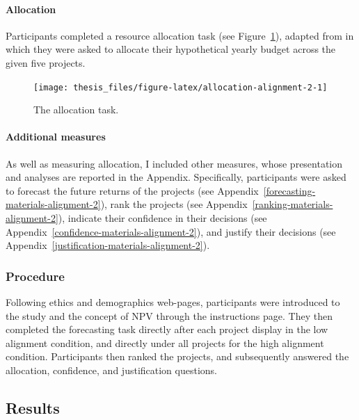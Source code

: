 \documentclass[a4paper, nobind, dvipsnames]{templates/ociamthesis}
\theoremstyle{definition}
\theoremstyle{definition}
\theoremstyle{definition}
\theoremstyle{definition}
\theoremstyle{remark}
\begin{document}
\paragraph{Allocation}

Participants completed a resource allocation task (see
Figure~\ref{fig:allocation-alignment-2}), adapted from \textcite{bardolet2011} in which
they were asked to allocate their hypothetical yearly budget across the given
five projects.



\begin{figure}
\texttt{[image: thesis\_files/figure-latex/allocation-alignment-2-1]} \caption{The allocation task.}\label{fig:allocation-alignment-2}
\end{figure}

\paragraph{Additional measures}

As well as measuring allocation, I included other measures, whose presentation
and analyses are reported in the Appendix. Specifically, participants were asked
to forecast the future returns of the projects (see
Appendix~\ref{forecasting-materials-alignment-2}), rank the projects (see
Appendix~\ref{ranking-materials-alignment-2}), indicate their confidence in
their decisions (see Appendix~\ref{confidence-materials-alignment-2}), and
justify their decisions (see
Appendix~\ref{justification-materials-alignment-2}).

\subsubsection{Procedure}

Following ethics and demographics web-pages, participants were introduced to the
study and the concept of NPV through the instructions page. They then completed
the forecasting task directly after each project display in the low alignment
condition, and directly under all projects for the high alignment condition.
Participants then ranked the projects, and subsequently answered the allocation,
confidence, and justification questions.

\subsection{Results}
\end{document}
